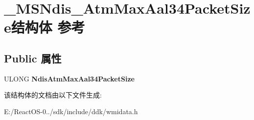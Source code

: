 \hypertarget{struct___m_s_ndis___atm_max_aal34_packet_size}{}\section{\+\_\+\+M\+S\+Ndis\+\_\+\+Atm\+Max\+Aal34\+Packet\+Size结构体 参考}
\label{struct___m_s_ndis___atm_max_aal34_packet_size}
\subsection*{Public 属性}
\begin{DoxyCompactItemize}
\item 
\mbox{\label{struct___m_s_ndis___atm_max_aal34_packet_size_ac7755b6f0000caf9e0b142928d8aac56}} 
U\+L\+O\+NG {\bfseries Ndis\+Atm\+Max\+Aal34\+Packet\+Size}
\end{DoxyCompactItemize}


该结构体的文档由以下文件生成\+:\begin{DoxyCompactItemize}
\item 
E\+:/\+React\+O\+S-\/0../sdk/include/ddk/wmidata.\+h\end{DoxyCompactItemize}
